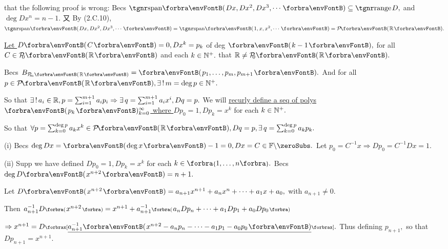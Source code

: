 \! \;\NOTICE that the following proof is wrong:\parSol{}
Becs $\Span{Dx,Dx^2,Dx^3,\cdots}\subseteq\range D,$ and $\deg Dx^n=n-1.$\parSol{}
又 By (2.C.10), $\Span{Dx,Dx^2,Dx^3,\cdots}=\Span{1,x,x^2,\cdots}=\PoRi.$\par\vspace{4pt}\quad
\uline{Let $D\Par{C}=0,Dx^k=p_k$} of deg $\Par{k-1},$ for all $C\in\PoR{0}$ and each $k\in{\mathbb{N}^+}.$ \NOTICE that $\Rbb\neq\PoR{0}.$\par\quad
Becs $B_{\PoR[\SmallPar]{m}}=\Par{p_1,\dots,p_m,p_{m+1}}.$ And for all $p\in\PoRi,\exists\,!\,m=\deg p\in\Nbp.$\par\quad
So that $\exists\,!\,a_i\in{\mathbb{R}},p=\sum_{i=1}^{m+1}a_ip_i\Rightarrow\exists\,q=\sum_{i=1}^{m+1}a_{i}x^{i},Dq=p.$\PfEnd\vspace{6pt}\quad
{\Or We will \uline{recurly define a seq of polys $\Par{p_k}{_{k=0}^\infty}$ where $Dp_0=1,Dp_k=x^k$} for each $k\in{\mathbb{N}^+}.$}\par\vspace{2pt}\quad
{\FontSmall So that $\forall p=\sum_{k=0}^{\deg p}a_k x^k\in\PoRi,Dq=p,\exists\,q={\sum_{k=0}^{\deg p}a_k p_k}.$}\par\vspace{4pt}\quad
(i) {Becs $\deg Dx=\Par{\!\deg x}-1=0,Dx=C\in\nonzeroFbb.$ Let $p_0=C^{-1}x\Rightarrow Dp_0=C^{-1}Dx=1.$}\vspace{2pt}\par\quad\Endi
(ii) {Supp we have defined $Dp_0=1,Dp_k=x^k$ for each $k\in\Bra{1,\dots,n}.$ Becs $\deg D\Par{x^{n+2}}=n+1.$}\vspace{2pt}\par\quad\Hii
{Let {\;$D\Par{x^{n+2}}=a_{n+1}x^{n+1}+a_n x^n+\dots+a_1 x+a_0,$} with $a_{n+1}\neq 0.$}\vspace{2pt}\par\quad\Hii
{Then {\;$a_{n+1}^{-1}D\BigPar{x^{n+2}}=x^{n+1}+a_{n+1}^{-1}\BigPar{a_n Dp_n+\dots+a_1 Dp_1 +a_0 Dp_0}$}}\vspace{2pt}\par\quad\Hii
{$\Rightarrow x^{n+1}=D\XSbra{\uline{a_{n+1}^{-1}\Par{x^{n+2}-a_n p_n-\dots-a_1 p_1-a_0 p_0}}}.$ Thus defining $p_{n+1},$ so that $Dp_{n+1}=x^{n+1}.$}\PfEnd
\SepLine

